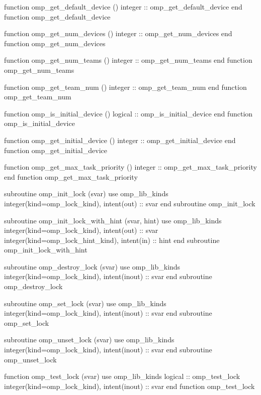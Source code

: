 {{\begin{codepar}
          function omp\_get\_default\_device ()
           integer :: omp\_get\_default\_device
          end function omp\_get\_default\_device

          function omp\_get\_num\_devices ()
           integer :: omp\_get\_num\_devices
          end function omp\_get\_num\_devices

          function omp\_get\_num\_teams ()
           integer :: omp\_get\_num\_teams
          end function omp\_get\_num\_teams

          function omp\_get\_team\_num ()
           integer :: omp\_get\_team\_num
          end function omp\_get\_team\_num

          function omp\_is\_initial\_device ()
           logical :: omp\_is\_initial\_device
          end function omp\_is\_initial\_device

          function omp\_get\_initial\_device ()
           integer :: omp\_get\_initial\_device
          end function omp\_get\_initial\_device

          function omp\_get\_max\_task\_priority ()
           integer :: omp\_get\_max\_task\_priority
          end function omp\_get\_max\_task\_priority

          subroutine omp\_init\_lock (svar)
           use omp\_lib\_kinds
           integer(kind=omp\_lock\_kind), intent(out) :: svar
          end subroutine omp\_init\_lock

          subroutine omp\_init\_lock\_with\_hint (svar, hint)
           use omp\_lib\_kinds
           integer(kind=omp\_lock\_kind), intent(out) :: svar
           integer(kind=omp\_lock\_hint\_kind), intent(in) :: hint
          end subroutine omp\_init\_lock\_with\_hint

          subroutine omp\_destroy\_lock (svar)
           use omp\_lib\_kinds
           integer(kind=omp\_lock\_kind), intent(inout) :: svar
          end subroutine omp\_destroy\_lock

          subroutine omp\_set\_lock (svar)
           use omp\_lib\_kinds
           integer(kind=omp\_lock\_kind), intent(inout) :: svar
          end subroutine omp\_set\_lock

          subroutine omp\_unset\_lock (svar)
           use omp\_lib\_kinds
           integer(kind=omp\_lock\_kind), intent(inout) :: svar
          end subroutine omp\_unset\_lock

          function omp\_test\_lock (svar)
           use omp\_lib\_kinds
           logical :: omp\_test\_lock
           integer(kind=omp\_lock\_kind), intent(inout) :: svar
          end function omp\_test\_lock


\end{codepar}}}
